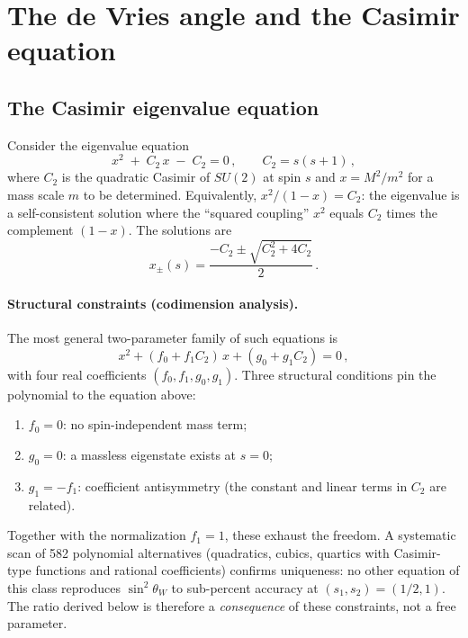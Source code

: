 \documentclass[12pt,a4paper]{article}
\begin{document}
\section{The de Vries angle and the Casimir equation}

\subsection{The Casimir eigenvalue equation}

Consider the eigenvalue equation
\begin{equation}
x^2 \;+\; C_2\,x \;-\; C_2 = 0\,,
\qquad C_2 = s(s+1)\,,
\end{equation}
where $C_2$ is the quadratic Casimir of $SU(2)$ at spin $s$ and
$x = M^2/m^2$ for a mass scale $m$ to be determined.  Equivalently,
$x^2/(1-x) = C_2$: the eigenvalue is a self-consistent solution
where the ``squared coupling'' $x^2$ equals $C_2$ times the
complement $(1-x)$.  The solutions are
\begin{equation}
x_{\pm}(s) = \frac{-C_2 \pm \sqrt{C_2^2 + 4C_2}}{2}\,.
\end{equation}

\paragraph{Structural constraints (codimension analysis).}
The most general two-parameter family of such equations is
\begin{equation}
x^2 + (f_0 + f_1 C_2)\,x + (g_0 + g_1 C_2) = 0\,,
\end{equation}
with four real coefficients $(f_0, f_1, g_0, g_1)$.  Three
structural conditions pin the polynomial to the equation above:
\begin{enumerate}
\item $f_0 = 0$: no spin-independent mass term;
\item $g_0 = 0$: a massless eigenstate exists at $s = 0$;
\item $g_1 = -f_1$: coefficient antisymmetry
  (the constant and linear terms in $C_2$ are related).
\end{enumerate}
Together with the normalization $f_1 = 1$, these exhaust the
freedom.  A systematic scan of 582 polynomial alternatives
(quadratics, cubics, quartics with Casimir-type functions and
rational coefficients) confirms uniqueness: no other
equation of this class reproduces $\sin^2\!\theta_W$ to
sub-percent accuracy at $(s_1, s_2) = (1/2, 1)$.
The ratio derived below is therefore a
\emph{consequence} of these constraints, not a free parameter.
\end{document}
